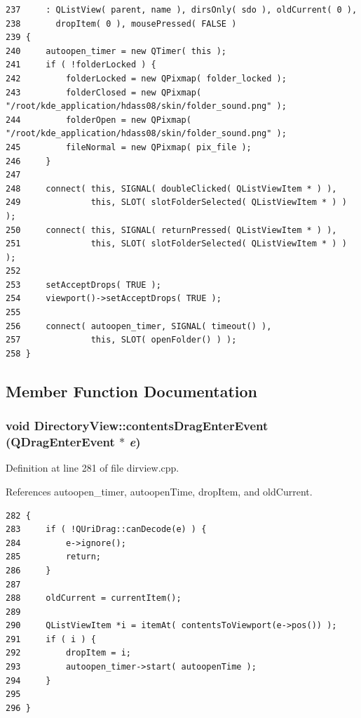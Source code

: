 \footnotesize\begin{verbatim}237     : QListView( parent, name ), dirsOnly( sdo ), oldCurrent( 0 ),
238       dropItem( 0 ), mousePressed( FALSE )
239 {
240     autoopen_timer = new QTimer( this );
241     if ( !folderLocked ) {
242         folderLocked = new QPixmap( folder_locked );
243         folderClosed = new QPixmap( "/root/kde_application/hdass08/skin/folder_sound.png" );
244         folderOpen = new QPixmap( "/root/kde_application/hdass08/skin/folder_sound.png" );
245         fileNormal = new QPixmap( pix_file );
246     }
247 
248     connect( this, SIGNAL( doubleClicked( QListViewItem * ) ),
249              this, SLOT( slotFolderSelected( QListViewItem * ) ) );
250     connect( this, SIGNAL( returnPressed( QListViewItem * ) ),
251              this, SLOT( slotFolderSelected( QListViewItem * ) ) );
252 
253     setAcceptDrops( TRUE );
254     viewport()->setAcceptDrops( TRUE );
255 
256     connect( autoopen_timer, SIGNAL( timeout() ),
257              this, SLOT( openFolder() ) );
258 }
\end{verbatim}\normalsize 


\subsection{Member Function Documentation}
\subsubsection{\setlength{\rightskip}{0pt plus 5cm}void Directory\-View::contents\-Drag\-Enter\-Event (QDrag\-Enter\-Event $\ast$ {\em e})\hspace{0.3cm}{\tt  [protected]}}\label{classDirectoryView_DirectoryViewb0}




Definition at line 281 of file dirview.cpp.

References autoopen\_\-timer, autoopen\-Time, drop\-Item, and old\-Current.



\footnotesize\begin{verbatim}282 {
283     if ( !QUriDrag::canDecode(e) ) {
284         e->ignore();
285         return;
286     }
287 
288     oldCurrent = currentItem();
289 
290     QListViewItem *i = itemAt( contentsToViewport(e->pos()) );
291     if ( i ) {
292         dropItem = i;
293         autoopen_timer->start( autoopenTime );
294     }
295     
296 }
\end{verbatim}\normalsize 
{}
